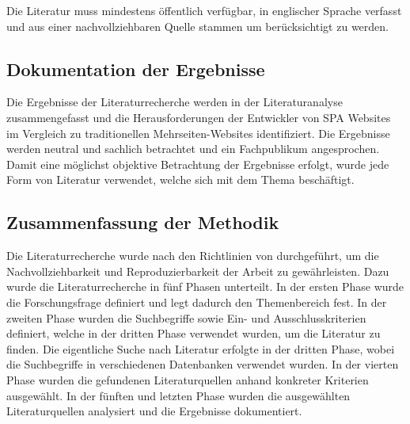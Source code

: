 Die Literatur muss mindestens öffentlich verfügbar, in englischer Sprache verfasst und aus einer nachvollziehbaren Quelle stammen um berücksichtigt zu werden.


\subsection{Dokumentation der Ergebnisse}
Die Ergebnisse der Literaturrecherche werden in der Literaturanalyse zusammengefasst und die Herausforderungen der Entwickler von \ac{SPA} Websites im Vergleich zu traditionellen Mehrseiten-Websites identifiziert.
Die Ergebnisse werden neutral und sachlich betrachtet und ein Fachpublikum angesprochen.
Damit eine möglichst objektive Betrachtung der Ergebnisse erfolgt, wurde jede Form von Literatur verwendet, welche sich mit dem Thema beschäftigt.

\subsection*{Zusammenfassung der Methodik}
Die Literaturrecherche wurde nach den Richtlinien von \citeauthor{conf/ecis/BrockeSNRPC09} durchgeführt, um die Nachvollziehbarkeit und Reproduzierbarkeit der Arbeit zu gewährleisten.
Dazu wurde die Literaturrecherche in fünf Phasen unterteilt.
In der ersten Phase wurde die Forschungsfrage definiert und legt dadurch den Themenbereich fest.
In der zweiten Phase wurden die Suchbegriffe sowie Ein- und Ausschlusskriterien definiert, welche in der dritten Phase verwendet wurden, um die Literatur zu finden.
Die eigentliche Suche nach Literatur erfolgte in der dritten Phase, wobei die Suchbegriffe in verschiedenen Datenbanken verwendet wurden.
In der vierten Phase wurden die gefundenen Literaturquellen anhand konkreter Kriterien ausgewählt.
In der fünften und letzten Phase wurden die ausgewählten Literaturquellen analysiert und die Ergebnisse dokumentiert.